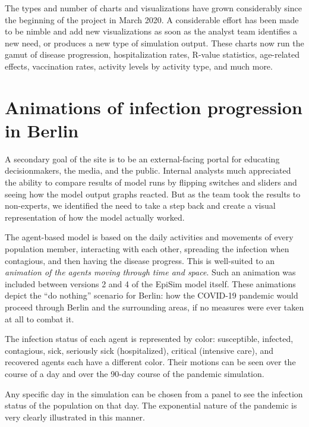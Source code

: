 The types and number of charts and visualizations have grown considerably since the beginning of the project in March 2020. A considerable effort has been made to be nimble and add new visualizations as soon as the analyst team identifies a new need, or produces a new type of simulation output. These charts now run the gamut of disease progression, hospitalization rates, R-value statistics, age-related effects, vaccination rates, activity levels by activity type, and much more.

\hypertarget{covid-animations-of-infection-progression-in-berlin}{%
\section{Animations of infection progression in Berlin}\label{animations-of-infection-progression-in-berlin}}

A secondary goal of the site is to be an external-facing portal for educating decisionmakers, the media, and the public. Internal analysts much appreciated the ability to compare results of model runs by flipping switches and sliders and seeing how the model output graphs reacted. But as the team took the results to non-experts, we identified the need to take a step back and create a visual representation of how the model actually worked.

The agent-based model is based on the daily activities and movements of every population member, interacting with each other, spreading the infection when contagious, and then having the disease progress. This is well-suited to an \emph{animation of the agents moving through time and space}. Such an animation was included between versions 2 and 4 of the EpiSim model itself. These animations depict the ``do nothing'' scenario for Berlin: how the COVID-19 pandemic would proceed through Berlin and the surrounding areas, if no measures were ever taken at all to combat it.

The infection status of each agent is represented by color: susceptible, infected, contagious, sick, seriously sick (hospitalized), critical (intensive care), and recovered agents each have a different color. Their motions can be seen over the course of a day and over the 90-day course of the pandemic simulation.

Any specific day in the simulation can be chosen from a panel to see the infection status of the population on that day. The exponential nature of the pandemic is very clearly illustrated in this manner.

